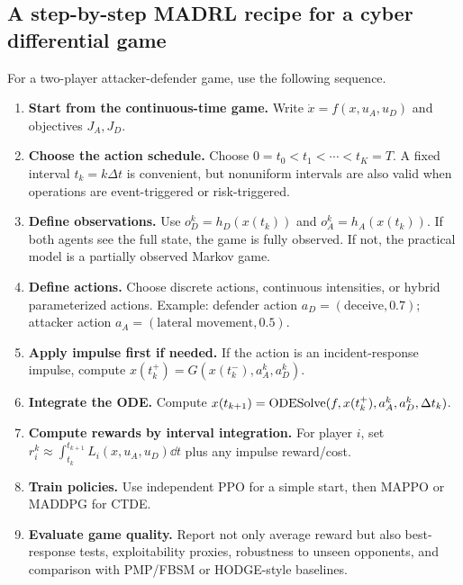 \documentclass[11pt,a4paper]{article}
\begin{document}
\subsection{A step-by-step MADRL recipe for a cyber differential game}
For a two-player attacker-defender game, use the following sequence.
\begin{enumerate}
\item \textbf{Start from the continuous-time game.} Write $\dot{x}=f(x,u_A,u_D)$ and objectives $J_A,J_D$.
\item \textbf{Choose the action schedule.} Choose $0=t_0<t_1<\cdots<t_K=T$. A fixed interval $t_k=k\Delta t$ is convenient, but nonuniform intervals are also valid when operations are event-triggered or risk-triggered.
\item \textbf{Define observations.} Use $o_D^k=h_D(x(t_k))$ and $o_A^k=h_A(x(t_k))$. If both agents see the full state, the game is fully observed. If not, the practical model is a partially observed Markov game.
\item \textbf{Define actions.} Choose discrete actions, continuous intensities, or hybrid parameterized actions. Example: defender action $a_D=(\text{deceive},0.7)$; attacker action $a_A=(\text{lateral movement},0.5)$.
\item \textbf{Apply impulse first if needed.} If the action is an incident-response impulse, compute $x(t_k^+)=G(x(t_k^-),a_A^k,a_D^k)$.
\item \textbf{Integrate the ODE.} Compute $x(t_{k+1})=\operatorname{ODESolve}(f,x(t_k^+),a_A^k,a_D^k,\Delta t_k)$.
\item \textbf{Compute rewards by interval integration.} For player $i$, set $r_i^k\approx \int_{t_k}^{t_{k+1}} L_i(x,u_A,u_D)\dd t$ plus any impulse reward/cost.
\item \textbf{Train policies.} Use independent PPO for a simple start, then MAPPO or MADDPG for CTDE.
\item \textbf{Evaluate game quality.} Report not only average reward but also best-response tests, exploitability proxies, robustness to unseen opponents, and comparison with PMP/FBSM or HODGE-style baselines.
\end{enumerate}
\end{document}
